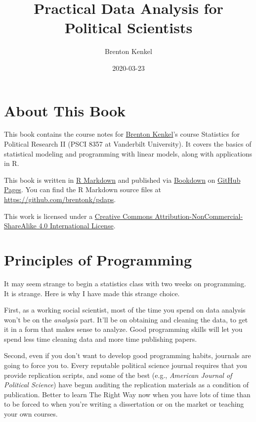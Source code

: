 \documentclass[
  12pt,
  oneside,openany]{book}
\title{Practical Data Analysis for Political Scientists}
\author{Brenton Kenkel}
\date{2020-03-23}
\begin{document}
\maketitle

{
\setcounter{tocdepth}{1}
\tableofcontents
}
\hypertarget{about-this-book}{%
\chapter{About This Book}\label{about-this-book}}

This book contains the course notes for \href{http://bkenkel.com}{Brenton Kenkel}'s course Statistics for Political Research II (PSCI 8357 at Vanderbilt University). It covers the basics of statistical modeling and programming with linear models, along with applications in R.

This book is written in \href{http://rmarkdown.rstudio.com}{R Markdown} and published via \href{https://bookdown.org}{Bookdown} on \href{https://pages.github.com}{GitHub Pages}. You can find the R Markdown source files at \url{https://github.com/brentonk/pdaps}.

This work is licensed under a \href{http://creativecommons.org/licenses/by-nc-sa/4.0/}{Creative Commons Attribution-NonCommercial-ShareAlike 4.0 International License}.

\hypertarget{programming}{%
\chapter{Principles of Programming}\label{programming}}

It may seem strange to begin a statistics class with two weeks on programming. It is strange. Here is why I have made this strange choice.

First, as a working social scientist, most of the time you spend on data analysis won't be on the \emph{analysis} part. It'll be on obtaining and cleaning the data, to get it in a form that makes sense to analyze. Good programming skills will let you spend less time cleaning data and more time publishing papers.

Second, even if you don't want to develop good programming habits, journals are going to force you to. Every reputable political science journal requires that you provide replication scripts, and some of the best (e.g., \emph{American Journal of Political Science}) have begun auditing the replication materials as a condition of publication. Better to learn The Right Way now when you have lots of time than to be forced to when you're writing a dissertation or on the market or teaching your own courses.
\end{document}
